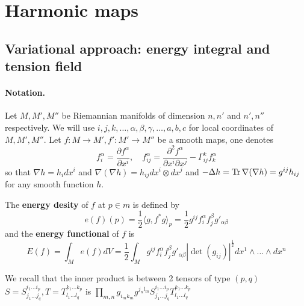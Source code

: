 \section{Harmonic maps}
\label{sec:org9145a27}
\subsection{Variational approach: energy integral and tension field}
\label{sec:org81233e1}
\paragraph{Notation.}
\label{sec:org8daaba0}
Let \(M, M', M''\) be Riemannian manifolds of dimension \(n, n'\) and \(n', n''\)
respectively. We will use \(i,j,k,\dots, \alpha,\beta,\gamma,\dots, a,b,c\) for local
coordinates of \(M, M', M''\).
Let \(f: M \longrightarrow M', f': M' \longrightarrow M''\) be a smooth maps, one denotes
\[
f^\alpha_i = \frac{\partial f^\alpha}{\partial x^i},\quad f^\alpha_{ij} =
\frac{\partial^2 f^\alpha}{\partial x^i \partial x^j} - \Gamma_{ij}^k f^{\alpha}_k \]
so that \(\nabla h = h_i dx^i\) and \(\nabla (\nabla h) = h_{ij}dx^i\otimes dx^j\) and
\(-\Delta h = \mathop{\rm Tr}\nolimits \nabla (\nabla h) = g^{ij}h_{ij}\) for any smooth function \(h\).


\begin{definition}
The \textbf{energy desity} of \(f\) at \(p\in m\) is defined by
\[
e(f)(p) = \frac{1}{2}\langle g, f^*g \rangle_p = \frac{1}{2}g^{ij}f^\alpha_i
f^\beta_j g'_{\alpha\beta}
\]
and the \textbf{energy functional} of \(f\) is
\[
E(f) = \int_M e(f) dV = \frac{1}{2}\int_M g^{ij}f^\alpha_i
f^\beta_j g'_{\alpha\beta} |\det (g_{ij})|^\frac{1}{2} dx^1\wedge \dots\wedge dx^n
\]
\end{definition}

We recall that the inner product is between 2 tensors of type \((p,q)\) \(S =
S^{i_1\dots i_p}_{j_1\dots j_q}, T = T^{k_1\dots k_p}_{l_1\dots l_q}\) is \(\prod_{m,n}
g_{i_m k_m} g^{j_n l_m}S^{i_1\dots i_p}_{j_1\dots j_q} T^{k_1\dots k_p}_{l_1\dots l_q}\)

